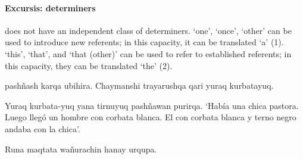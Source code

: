 {\paragraph{Excursis: determiners}
\SYQ{} does not have an independent class of determiners.  `one', `once', `other' can be used to introduce new
referents; in this capacity, it can be translated `a' (1).  `this',  `that', and  `that (other)' can be used to refer to established referents; in this capacity, they can be translated `the' (2).

%
{ pash\~nash karqa ubihira. Chaymanshi trayarushqa  qari yuraq kurbatayuq.}%
{}%
{}{}%

%
{Yuraq kurbata-yuq yana tirnuyuq  pash\~nawan purirqa.}%
{}%
%
{`Hab\'ia una chica pastora. Luego lleg\'o un hombre con corbata blanca. El con corbata blanca y terno negro andaba con la chica'.}%
{}{}%

%
{Runa  maqtata wa\~nurachin hanay urqupa.}%
{}%
{}{}%

}
